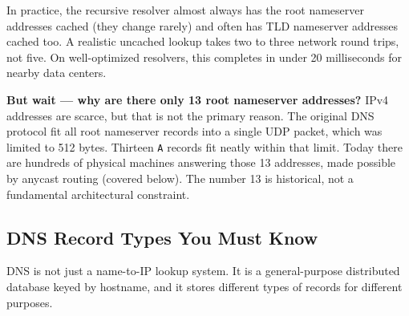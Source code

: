 \documentclass[11pt,a4paper]{article}
\begin{document}
In practice, the recursive resolver almost always has the root nameserver addresses cached (they change rarely) and often has TLD nameserver addresses cached too. A realistic uncached lookup takes two to three network round trips, not five. On well-optimized resolvers, this completes in under 20 milliseconds for nearby data centers.

\begin{thinkbox}
\textbf{But wait --- why are there only 13 root nameserver addresses?} IPv4 addresses are scarce, but that is not the primary reason. The original DNS protocol fit all root nameserver records into a single UDP packet, which was limited to 512 bytes. Thirteen \texttt{A} records fit neatly within that limit. Today there are hundreds of physical machines answering those 13 addresses, made possible by anycast routing (covered below). The number 13 is historical, not a fundamental architectural constraint.
\end{thinkbox}

\subsection{DNS Record Types You Must Know}

DNS is not just a name-to-IP lookup system. It is a general-purpose distributed database keyed by hostname, and it stores different types of records for different purposes.
\end{document}
